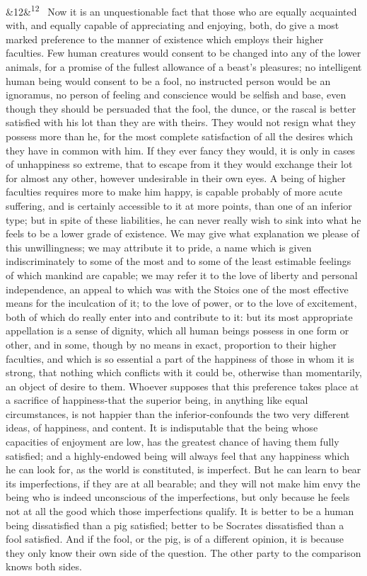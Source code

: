 \documentclass[12pt]{article}
\newcommand{\para}[1][]{\par\noindent\ifx&#1&\else\textsuperscript{\footnotesize #1}~\fi}
\begin{document}
\para[12] Now it is an unquestionable fact that those who are equally acquainted with, and equally capable of appreciating and enjoying, both, do give a most marked preference to the manner of existence which employs their higher faculties. Few human creatures would consent to be changed into any of the lower animals, for a promise of the fullest allowance of a beast's pleasures; no intelligent human being would consent to be a fool, no instructed person would be an ignoramus, no person of feeling and conscience would be selfish and base, even though they should be persuaded that the fool, the dunce, or the rascal is better satisfied with his lot than they are with theirs. They would not resign what they possess more than he, for the most complete satisfaction of all the desires which they have in common with him. If they ever fancy they would, it is only in cases of unhappiness so extreme, that to escape from it they would exchange their lot for almost any other, however undesirable in their own eyes. A being of higher faculties requires more to make him happy, is capable probably of more acute suffering, and is certainly accessible to it at more points, than one of an inferior type; but in spite of these liabilities, he can never really wish to sink into what he feels to be a lower grade of existence. We may give what explanation we please of this unwillingness; we may attribute it to pride, a name which is given indiscriminately to some of the most and to some of the least estimable feelings of which mankind are capable; we may refer it to the love of liberty and personal independence, an appeal to which was with the Stoics one of the most effective means for the inculcation of it; to the love of power, or to the love of excitement, both of which do really enter into and contribute to it: but its most appropriate appellation is a sense of dignity, which all human beings possess in one form or other, and in some, though by no means in exact, proportion to their higher faculties, and which is so essential a part of the happiness of those in whom it is strong, that nothing which conflicts with it could be, otherwise than momentarily, an object of desire to them. Whoever supposes that this preference takes place at a sacrifice of happiness-that the superior being, in anything like equal circumstances, is not happier than the inferior-confounds the two very different ideas, of happiness, and content. It is indisputable that the being whose capacities of enjoyment are low, has the greatest chance of having them fully satisfied; and a highly-endowed being will always feel that any happiness which he can look for, as the world is constituted, is imperfect. But he can learn to bear its imperfections, if they are at all bearable; and they will not make him envy the being who is indeed unconscious of the imperfections, but only because he feels not at all the good which those imperfections qualify. It is better to be a human being dissatisfied than a pig satisfied; better to be Socrates dissatisfied than a fool satisfied. And if the fool, or the pig, is of a different opinion, it is because they only know their own side of the question. The other party to the comparison knows both sides.
\end{document}
